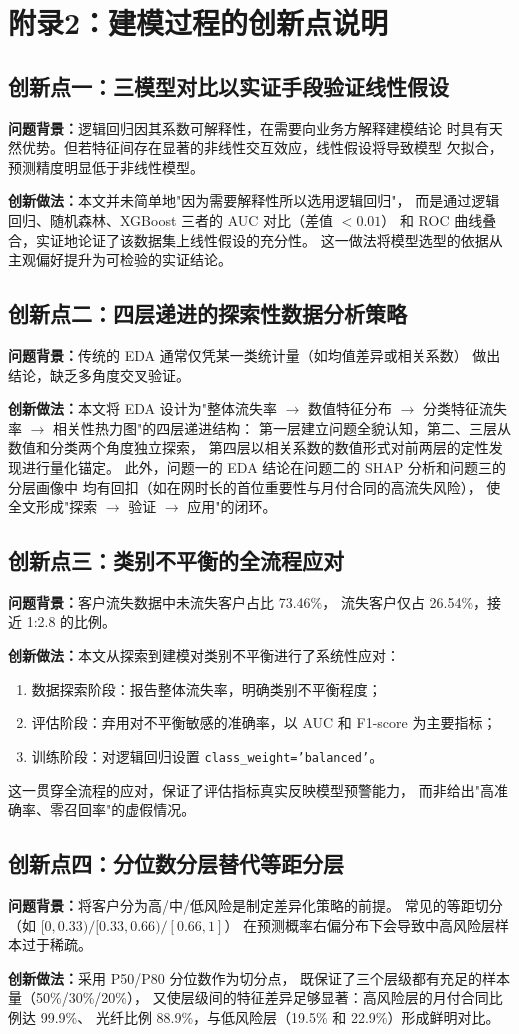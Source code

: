 \section{附录2：建模过程的创新点说明}

\subsection*{创新点一：三模型对比以实证手段验证线性假设}

\textbf{问题背景：}逻辑回归因其系数可解释性，在需要向业务方解释建模结论
时具有天然优势。但若特征间存在显著的非线性交互效应，线性假设将导致模型
欠拟合，预测精度明显低于非线性模型。

\textbf{创新做法：}本文并未简单地"因为需要解释性所以选用逻辑回归"，
而是通过逻辑回归、随机森林、XGBoost 三者的 AUC 对比（差值 $< 0.01$）
和 ROC 曲线叠合，实证地论证了该数据集上线性假设的充分性。
这一做法将模型选型的依据从主观偏好提升为可检验的实证结论。

\subsection*{创新点二：四层递进的探索性数据分析策略}

\textbf{问题背景：}传统的 EDA 通常仅凭某一类统计量（如均值差异或相关系数）
做出结论，缺乏多角度交叉验证。

\textbf{创新做法：}本文将 EDA 设计为"整体流失率 $\to$ 数值特征分布
$\to$ 分类特征流失率 $\to$ 相关性热力图"的四层递进结构：
第一层建立问题全貌认知，第二、三层从数值和分类两个角度独立探索，
第四层以相关系数的数值形式对前两层的定性发现进行量化锚定。
此外，问题一的 EDA 结论在问题二的 SHAP 分析和问题三的分层画像中
均有回扣（如在网时长的首位重要性与月付合同的高流失风险），
使全文形成"探索 $\to$ 验证 $\to$ 应用"的闭环。

\subsection*{创新点三：类别不平衡的全流程应对}

\textbf{问题背景：}客户流失数据中未流失客户占比 73.46\%，
流失客户仅占 26.54\%，接近 1:2.8 的比例。

\textbf{创新做法：}本文从探索到建模对类别不平衡进行了系统性应对：
\begin{enumerate}[nosep]
    \item 数据探索阶段：报告整体流失率，明确类别不平衡程度；
    \item 评估阶段：弃用对不平衡敏感的准确率，以 AUC 和 F1-score 为主要指标；
    \item 训练阶段：对逻辑回归设置 \texttt{class\_weight='balanced'}。
\end{enumerate}
这一贯穿全流程的应对，保证了评估指标真实反映模型预警能力，
而非给出"高准确率、零召回率"的虚假情况。

\subsection*{创新点四：分位数分层替代等距分层}

\textbf{问题背景：}将客户分为高/中/低风险是制定差异化策略的前提。
常见的等距切分（如 $[0,0.33)/[0.33,0.66)/[0.66,1]$）
在预测概率右偏分布下会导致中高风险层样本过于稀疏。

\textbf{创新做法：}采用 P50/P80 分位数作为切分点，
既保证了三个层级都有充足的样本量（50\%/30\%/20\%），
又使层级间的特征差异足够显著：高风险层的月付合同比例达 99.9\%、
光纤比例 88.9\%，与低风险层（19.5\% 和 22.9\%）形成鲜明对比。
